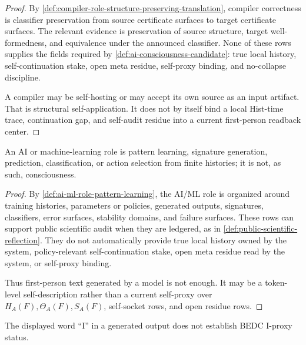 \begin{proof}
By \autoref{def:compiler-role-structure-preserving-translation}, compiler
correctness is classifier preservation from source certificate surfaces
to target certificate surfaces. The relevant evidence is preservation of
source structure, target well-formedness, and equivalence under the
announced classifier. None of these rows supplies the fields required by
\autoref{def:ai-consciousness-candidate}: true local history,
self-continuation stake, open meta residue, self-proxy binding, and
no-collapse discipline.

A compiler may be self-hosting or may accept its own source as an input
artifact. That is structural self-application. It does not by itself bind
a local Hist-time trace, continuation gap, and self-audit residue into a
current first-person readback center.
\end{proof}

\begin{theorem}
\label{thm:ai-learning-fit-generation-not-consciousness}
An AI or machine-learning role is pattern learning, signature generation,
prediction, classification, or action selection from finite histories; it
is not, as such, consciousness.
\end{theorem}

\begin{proof}
By \autoref{def:ai-ml-role-pattern-learning}, the AI/ML role is organized
around training histories, parameters or policies, generated outputs,
signatures, classifiers, error surfaces, stability domains, and failure
surfaces. These rows can support public scientific audit when they are
ledgered, as in \autoref{def:public-scientific-reflection}. They do not
automatically provide true local history owned by the system,
policy-relevant self-continuation stake, open meta residue read by the
system, or self-proxy binding.

Thus first-person text generated by a model is not enough. It may be a
token-level self-description rather than a current self-proxy over
$H_A(F),\Theta_A(F),S_A(F)$, self-socket rows, and open residue rows.
\end{proof}

\begin{corollary}
\label{cor:prompt-self-talk-not-i-proxy-comparison}
The displayed word ``I'' in a generated output does not establish
BEDC I-proxy status.
\end{corollary}

